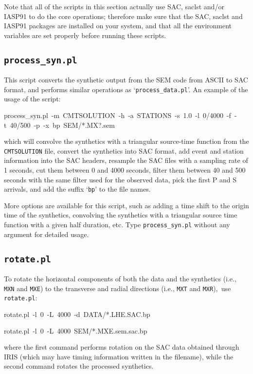 Note that all of the scripts in this section actually use SAC,
saclst and/or IASP91 to do the core operations; therefore make sure
that the SAC, saclst and IASP91 packages are installed on your
system, and that all the environment variables are set properly before
running these scripts.


\subsection{\texttt{process\_syn.pl}}\label{sub:process_syn.pl}

This script converts the synthetic output from the SEM code from ASCII
to SAC format, and performs similar operations as `\texttt{process\_data.pl}'.
An example of the usage of the script:

\begin{lyxcode}
{\footnotesize process\_syn.pl~-m~CMTSOLUTION~-h~-a~STATIONS~-s~1.0~-l~0/4000~-f~-t~40/500~-p~-x~bp~SEM/{*}.MX?.sem}{\footnotesize \par}
\end{lyxcode}
which will convolve the synthetics with a triangular source-time function
from the \texttt{CMTSOLUTION} file, convert the synthetics into SAC
format, add event and station information into the SAC headers, resample the SAC files with a sampling rate of 1 seconds, cut them between 0 and 4000 seconds, filter them between 40 and
500 seconds with the same filter used for the observed data, pick the first P and S arrivals, and add the suffix `\texttt{bp}'
to the file names.

More options are available for this script, such as adding a time shift
to the origin time of the synthetics, convolving the synthetics with
a triangular source time function with a given half duration, etc.
Type \texttt{process\_syn.pl} without any argument for detailed
usage.


\subsection{\texttt{rotate.pl}}

To rotate the horizontal components of both the data and the synthetics
(i.e., \texttt{MXN} and \texttt{MXE}) to the transverse and radial directions (i.e., \texttt{MXT} and \texttt{MXR}),\texttt{\small{}
}use{\small{} }\texttt{\small rotate.pl}:

\begin{lyxcode}
rotate.pl~-l~0~-L~4000~-d~DATA/{*}.LHE.SAC.bp~

rotate.pl~-l~0~-L~4000~SEM/{*}.MXE.sem.sac.bp~
\end{lyxcode}
where the first command performs rotation on the SAC data obtained
through IRIS (which may have timing information written in the filename),
while the second command rotates the processed synthetics.

